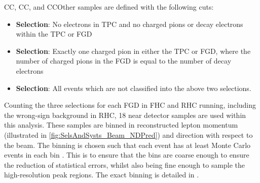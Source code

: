 CC\quickmath{0\pi}, CC\quickmath{1\pi}, and CCOther samples are defined with the following cuts:

\begin{itemize}
\item \textbf{ Selection}: No electrons in TPC and no charged pions or decay electrons within the TPC or FGD
\item \textbf{ Selection}: Exactly one charged pion in either the TPC or FGD, where the number of charged pions in the FGD is equal to the number of decay electrons
\item \textbf{ Selection}: All events which are not classified into the above two selections.
\end{itemize}

Counting the three selections for each FGD in FHC and RHC running, including the wrong-sign background in RHC, 18 near detector samples are used within this analysis. These samples are binned in reconstructed lepton momentum (illustrated in \autoref{fig:SelsAndSysts_Beam_NDPred}) and direction with respect to the beam. The binning is chosen such that each event has at least  Monte Carlo events in each bin \cite{thesis_will}. This is to ensure that the bins are coarse enough to ensure the reduction of statistical errors, whilst also being fine enough to sample the high-resolution peak regions. The exact binning is detailed in \cite{thesis_will}.


